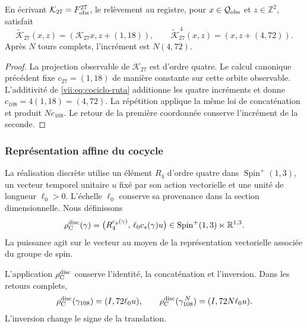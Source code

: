 \begin{proposition}
\label{vii:prop:memoria-vuelta-completa}
En écrivant \(\mathcal K_{27}=F_{\rm obs}^{27}\), le relèvement
au registre, pour \(x\in\mathcal Q_{\rm obs}\) et \(z\in\mathbb Z^2\), satisfait
\[
 \widetilde{\mathcal K}_{27}(x,z)
   =(\mathcal K_{27}x,z+(1,18)),\qquad
 \widetilde{\mathcal K}_{27}^{\,4}(x,z)
   =(x,z+(4,72)).
\]
Après \(N\) tours complets, l'incrément est \(N(4,72)\).
\end{proposition}

\begin{proof}
La projection observable de \(\mathcal K_{27}\) est d'ordre quatre. Le calcul canonique précédent fixe \(c_{27}=(1,18)\) de manière constante sur cette orbite observable. L'additivité de \eqref{vii:eq:cociclo-ruta} additionne les quatre incréments et donne \(c_{108}=4(1,18)=(4,72)\). La répétition applique la même loi de concaténation et produit \(Nc_{108}\). Le retour de la première coordonnée conserve l'incrément de la seconde.
\end{proof}

\subsubsection{Représentation affine du cocycle}
\label{vii:subsec:representacion-afin-cociclo}

La réalisation discrète utilise un élément \(R_4\) d'ordre quatre dans
\(\operatorname{Spin}^+(1,3)\), un vecteur temporel unitaire \(u\)
fixé par son action vectorielle et une unité de longueur \(\ell_0>0\).
L'échelle \(\ell_0\) conserve sa provenance dans la section dimensionnelle.
Nous définissons
\begin{equation}
 \rho_{\rm C}^{\rm disc}(\gamma)=
 \bigl(R_4^{c_g(\gamma)},\,\ell_0c_s(\gamma)u\bigr)
 \in\operatorname{Spin}^+(1,3)\ltimes\mathbb R^{1,3}.
 \label{vii:eq:representacion-discreta-memoria}
\end{equation}
La puissance agit sur le vecteur au moyen de la représentation vectorielle
associée du groupe de spin.

\begin{theorem}
\label{vii:thm:traslacion-memoria}
L'application \(\rho_{\rm C}^{\rm disc}\) conserve l'identité,
la concaténation et l'inversion. Dans les retours complets,
\begin{equation}
 \rho_{\rm C}^{\rm disc}(\gamma_{108})=(I,72\ell_0u),\qquad
 \rho_{\rm C}^{\rm disc}(\gamma_{108}^{\,N})=(I,72N\ell_0u).
 \label{vii:eq:traslacion-retorno-108}
\end{equation}
L'inversion change le signe de la translation.
\end{theorem}

